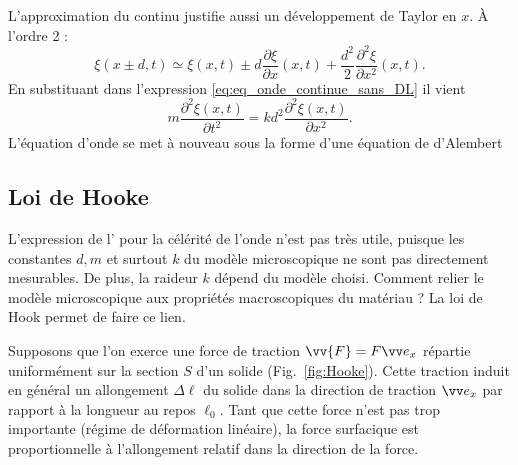 \documentclass[12pt,fancy]{cours}
\begin{document}
  
  L’approximation du continu justifie aussi un développement de Taylor en $x$. À l’ordre 2 :
  \begin{equation}
  \xi(x\pm d,t) \simeq \xi(x,t)\pm d\frac{\partial \xi}{\partial x}(x,t)+\frac{d^2}{2}\frac{\partial^2\xi}{\partial x^2}(x,t).
  \end{equation}
  En substituant dans l'expression \eqref{eq:eq_onde_continue_sans_DL} il vient
   \begin{equation}
m\frac{\partial^2 \xi(x,t)}{\partial t^2}=kd^2\frac{\partial^2\xi(x,t)}{\partial x^2}.
  \end{equation}
  L'équation d'onde se met à nouveau sous la forme d'une équation de d'Alembert
  

\subsection{Loi de Hooke}
L'expression de l’ pour la célérité de l'onde n’est pas très utile, puisque les constantes $d, m$ et surtout $k$  du modèle microscopique ne sont pas directement mesurables. De plus, la raideur $k$ dépend du modèle choisi. Comment relier le modèle microscopique aux propriétés macroscopiques du matériau ? La loi de Hook permet de faire ce lien.


Supposons que l'on exerce une force de traction $\vv{F}=F \ex $ répartie uniformément sur la section $S$ d'un solide (Fig.~\ref{fig:Hooke}). Cette traction induit en général un allongement $\Delta \ell$ du solide dans la direction de traction $\ex$ par rapport à la longueur au repos $\ell_0$.
Tant que cette force n'est pas trop importante (régime de déformation linéaire), la force surfacique est proportionnelle à l'allongement relatif dans la direction de la force.
\end{document}
